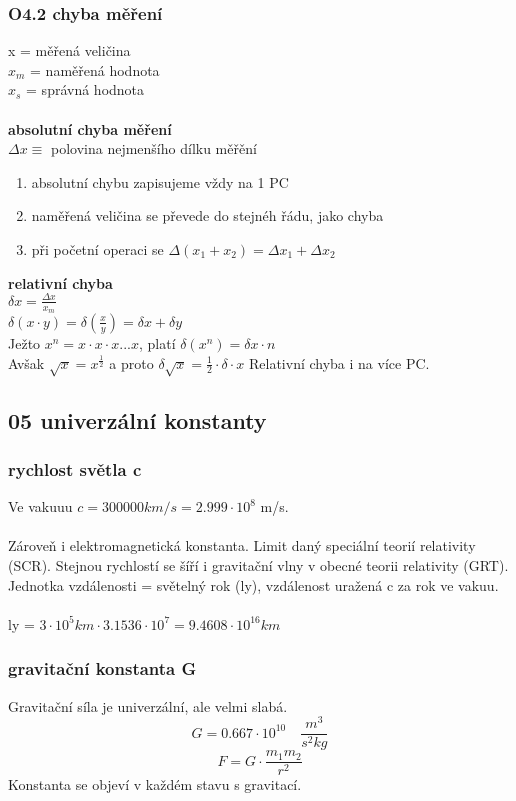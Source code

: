 \documentclass{article}
\begin{document}
\subsubsection*{O4.2 chyba měření}
x = měřená veličina \\
$x_m$ = naměřená hodnota \\
$x_s$ = správná hodnota \\\\
\textbf{absolutní chyba měření} \\
$\Delta x \equiv$ polovina nejmenšího dílku měřění \\
\begin{enumerate}
    \item absolutní chybu zapisujeme vždy na 1 PC
    \item naměřená veličina se převede do stejnéh řádu, jako chyba
    \item při početní operaci se $\Delta(x_1+x_2) = \Delta x_1 + \Delta x_2$
\end{enumerate}
\textbf{relativní chyba} \\
$\delta x = \frac{\Delta x }{x_m}$ \\
$\delta (x \cdot y) = \delta(\frac{x}{y}) = \delta x + \delta y$ \\
Ježto $x^n = x \cdot x \cdot x ... x$, platí $\delta (x^n) = \delta x \cdot n$ \\
Avšak $\sqrt{x} = x^{\frac{1}{2}}$ a proto $\delta \sqrt{x} = \frac{1}{2} \cdot \delta \cdot x$
Relativní chyba i na více PC.

\subsection*{05 univerzální konstanty}
\subsubsection*{rychlost světla c}
Ve vakuuu $c = 300 000 km/s = 2.999 \cdot 10^8$ m/s. \\\\
Zároveň i elektromagnetická konstanta. Limit daný speciální teorií relativity (SCR). Stejnou rychlostí se šíří i gravitační vlny v obecné teorii relativity (GRT). Jednotka vzdálenosti = světelný rok (ly), vzdálenost uražená c za rok ve vakuu. \\\\
ly = $3 \cdot 10^5 km \cdot 3.1536 \cdot 10^7 = 9.4608 \cdot 10^16 km$
\subsubsection*{gravitační konstanta G}
Gravitační síla je univerzální, ale velmi slabá. 
\[
G = 0.667 \cdot 10^{10} \quad \frac{m^3}{s^2kg}
\]
\[
F = G \cdot \frac{m_1m_2}{r^2}
\]
Konstanta se objeví v každém stavu s gravitací.
\end{document}
